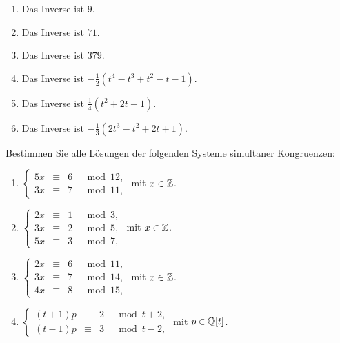 \begin{solution}
  \begin{enumerate}
    \item
      Das Inverse ist $9$.
    \item
      Das Inverse ist $71$.
    \item
      Das Inverse ist $379$.
    \item
      Das Inverse ist $-\frac{1}{2}(t^4 - t^3 + t^2 - t - 1)$.
    \item
      Das Inverse ist $\frac{1}{4}(t^2 + 2 t - 1)$.
    \item
      Das Inverse ist $-\frac{1}{3}(2 t^3 - t^2 + 2 t + 1)$.
  \end{enumerate}
\end{solution}


\begin{question}[subtitle = Simultane Kongruenzen]
  Bestimmen Sie alle Lösungen der folgenden Systeme simultaner Kongruenzen:
  \begin{enumerate}
    \item
      $
        \left\{
          \begin{array}{rcrr}
            5x  &\equiv&  6 & \mod 12, \\
            3x  &\equiv&  7 & \mod 11,
          \end{array}
        \right.
      $
      mit $x \in \mathbb{Z}$.
    \item
      $
        \left\{
          \begin{array}{rcrr}
            2x  &\equiv&  1 & \mod 3, \\
            3x  &\equiv&  2 & \mod 5, \\
            5x  &\equiv&  3 & \mod 7,
          \end{array}
        \right.
      $
      mit $x \in \mathbb{Z}$.
    \item
      $
        \left\{
          \begin{array}{rcrr}
            2x  &\equiv&  6 & \mod 11, \\
            3x  &\equiv&  7 & \mod 14, \\
            4x  &\equiv&  8 & \mod 15,
          \end{array}
        \right.
      $
      mit $x \in \mathbb{Z}$.
    \item
      $
        \left\{
          \begin{array}{rcrr}
            (t+1)p  &\equiv&  2 & \mod t+2, \\
            (t-1)p  &\equiv&  3 & \mod t-2,
          \end{array}
        \right.
      $
      mit $p \in \mathbb{Q}[t]$.
  \end{enumerate}
\end{question}


